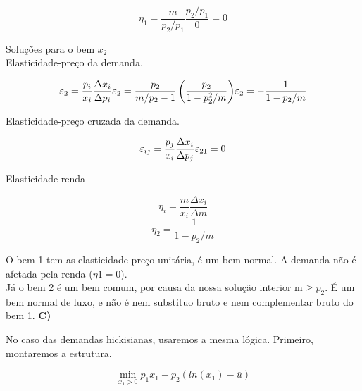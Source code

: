 \begin{flushleft}
\begin{equation}
\eta_{1} = \dfrac{m}{p_{2}/p_{1}} \dfrac{p_{2}/p_{1}}{0}  = 0
\end{equation}

\begin{center}
	Soluções para o bem $x_{2}$
	\\
	Elasticidade-preço da demanda.
\end{center}

\begin{equation}
\varepsilon_{2} = \dfrac{p_{i}}{x_{i}} \dfrac{ \Delta x_{i}}{\Delta p_{i}}
$$\\$$
\varepsilon_{2} = \dfrac{p_{2}}{m/p_{2}-1} \left( \dfrac{p_{2}}{1-p_{2}^{2}/m} \right)
$$\\$$
\varepsilon_{2} = - \dfrac{1}{1-p_{2}/m}
\end{equation}

\begin{center}
	Elasticidade-preço cruzada da demanda.
\end{center}

\begin{equation}
\varepsilon_{ij} = \dfrac{p_{j}}{x_{i}} \dfrac{\Delta x_{i}}{\Delta p_{j}}
$$\\$$
\varepsilon_{21} = 0
\end{equation}

\begin{center}
	Elasticidade-renda 
\end{center}

\begin{equation}
\eta_{i} = \dfrac{m}{x_{i}} \dfrac{\Delta x_{i}}{\Delta m}
\end{equation}
\begin{equation}
\eta_{2} = \dfrac{1}{1-p_{2}/m}
\end{equation}
\singlespacing

O bem 1 tem as elasticidade-preço unitária, é um bem normal. A demanda não é afetada pela renda ($\eta{1} = 0 $).
\\
Já o bem 2 é um bem comum, por causa da nossa solução interior m$\geq p_{2}$. É um bem normal de luxo, e não é nem substituo bruto e nem complementar bruto do bem 1.
\singlespacing
\textbf{C)} 

\begin{center}
No caso das demandas hickisianas, usaremos a mesma lógica. Primeiro, montaremos a estrutura.
\end{center}

\begin{equation}
\min_{x_{1}>0} p_{1}x_{1} - p_{2}(ln(x_{1})- \overline{u} )
\end{equation}


\end{flushleft}
